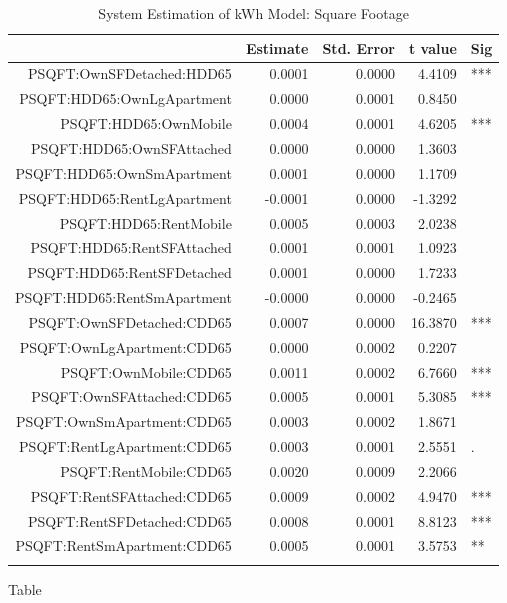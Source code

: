 \documentclass{article}
\begin{document}
{\small
\begin{longtable}{rrrrl}
\caption{System Estimation of kWh Model: Square Footage} \\ 
  \hline
 & Estimate & Std. Error & t value & Sig \\ 
  \hline
PSQFT:OwnSFDetached:HDD65 & 0.0001 & 0.0000 & 4.4109 & *** \\ 
  PSQFT:HDD65:OwnLgApartment & 0.0000 & 0.0001 & 0.8450 &   \\ 
  PSQFT:HDD65:OwnMobile & 0.0004 & 0.0001 & 4.6205 & *** \\ 
  PSQFT:HDD65:OwnSFAttached & 0.0000 & 0.0000 & 1.3603 &   \\ 
  PSQFT:HDD65:OwnSmApartment & 0.0001 & 0.0000 & 1.1709 &   \\ 
  PSQFT:HDD65:RentLgApartment & -0.0001 & 0.0000 & -1.3292 &   \\ 
  PSQFT:HDD65:RentMobile & 0.0005 & 0.0003 & 2.0238 &   \\ 
  PSQFT:HDD65:RentSFAttached & 0.0001 & 0.0001 & 1.0923 &   \\ 
  PSQFT:HDD65:RentSFDetached & 0.0001 & 0.0000 & 1.7233 &   \\ 
  PSQFT:HDD65:RentSmApartment & -0.0000 & 0.0000 & -0.2465 &   \\ 
  PSQFT:OwnSFDetached:CDD65 & 0.0007 & 0.0000 & 16.3870 & *** \\ 
  PSQFT:OwnLgApartment:CDD65 & 0.0000 & 0.0002 & 0.2207 &   \\ 
  PSQFT:OwnMobile:CDD65 & 0.0011 & 0.0002 & 6.7660 & *** \\ 
  PSQFT:OwnSFAttached:CDD65 & 0.0005 & 0.0001 & 5.3085 & *** \\ 
  PSQFT:OwnSmApartment:CDD65 & 0.0003 & 0.0002 & 1.8671 &   \\ 
  PSQFT:RentLgApartment:CDD65 & 0.0003 & 0.0001 & 2.5551 & . \\ 
  PSQFT:RentMobile:CDD65 & 0.0020 & 0.0009 & 2.2066 &   \\ 
  PSQFT:RentSFAttached:CDD65 & 0.0009 & 0.0002 & 4.9470 & *** \\ 
  PSQFT:RentSFDetached:CDD65 & 0.0008 & 0.0001 & 8.8123 & *** \\ 
  PSQFT:RentSmApartment:CDD65 & 0.0005 & 0.0001 & 3.5753 & ** \\ 
   \hline
\hline
\label{tab:SystemKWHSQFT}
\end{longtable}
}
Table 
\end{document}
